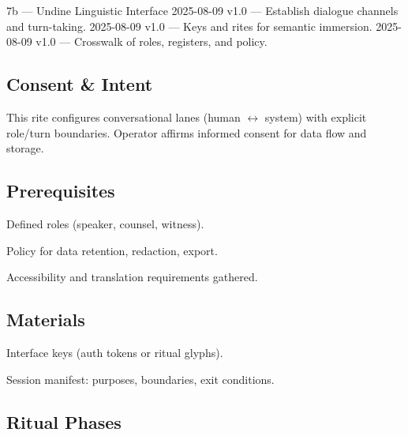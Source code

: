 \label{sec:cast7b-undine}

\begin{SectionHeaderLedger}{7b — Undine Linguistic Interface}
     2025-08-09 v1.0 — Establish dialogue channels and turn-taking.
   2025-08-09 v1.0 — Keys and rites for semantic immersion.
     2025-08-09 v1.0 — Crosswalk of roles, registers, and policy.
\end{SectionHeaderLedger}

\subsection*{Consent \& Intent}
This rite configures conversational lanes (human \(\leftrightarrow\) system) with explicit
role/turn boundaries. Operator affirms informed consent for data flow and storage.

\subsection*{Prerequisites}
\begin{tightitemize}
  \item Defined roles (speaker, counsel, witness).
  \item Policy for data retention, redaction, export.
  \item Accessibility and translation requirements gathered.
\end{tightitemize}

\subsection*{Materials}
\begin{tightitemize}
  \item Interface keys (auth tokens or ritual glyphs).
  \item Session manifest: purposes, boundaries, exit conditions.
\end{tightitemize}

\subsection*{Ritual Phases}
